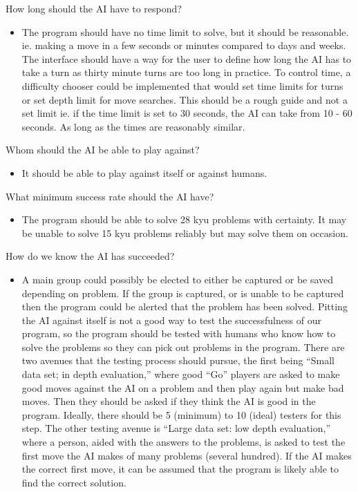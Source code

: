 \documentclass{l3proj}
\begin{document}
How long should the AI have to respond?
\begin{itemize}
\item The program should have no time limit to solve, but it should be reasonable. ie. making a move in a few seconds or minutes compared to days and weeks.  The interface should have a way for the user to define how long the AI has to take a turn as thirty minute turns are too long in practice.  To control time, a difficulty chooser could be implemented that would set time limits for turns or set depth limit for move searches.  This should be a rough guide and not a set limit ie. if the time limit is set to 30 seconds, the AI can take from 10 - 60 seconds. As long as the times are reasonably similar.
\end{itemize}
Whom should the AI be able to play against?
\begin{itemize}
\item It should be able to play against itself or against humans.
\end{itemize}
What minimum success rate should the AI have?
\begin{itemize}
\item The program should be able to solve 28 kyu problems with certainty.  It may be unable to solve 15 kyu problems reliably but may solve them on occasion.
\end{itemize}
How do we know the AI has succeeded?
\begin{itemize}
\item A main group could possibly be elected to either be captured or be saved depending on problem.  If the group is captured, or is unable to be captured then the program could be alerted that the problem has been solved.  Pitting the AI against itself is not a good way to test the successfulness of our program, so the program should be tested with humans who know how to solve the problems so they can pick out problems in the program. There are two avenues that the testing process should pursue, the first being “Small data set; in depth evaluation,” where good “Go” players are asked to make good moves against the AI on a problem and then play again but make bad moves. Then they should be asked if they think the AI is good in the program.  Ideally, there should be 5 (minimum) to 10 (ideal) testers for this step.  The other testing avenue is “Large data set: low depth evaluation,” where a person, aided with the answers to the problems, is asked to test the first move the AI makes of many problems (several hundred). If the AI makes the correct first move, it can be assumed that the program is likely able to find the correct solution.
\end{itemize}
\end{document}
